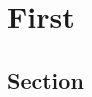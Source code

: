 \documentclass[ebook]{memoir}
\begin{document}


\chapter{First}
\lipsum[2-10]
\section{Section}
\end{document}
